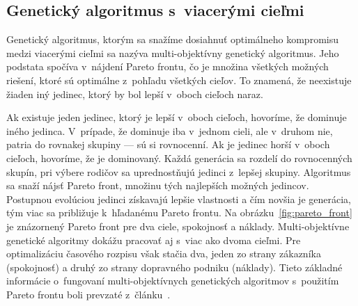 \subsection*{Genetický algoritmus s~viacerými cieľmi}
Genetický algoritmus, ktorým sa snažíme dosiahnuť optimálneho kompromisu medzi viacerými cieľmi sa nazýva multi-objektívny genetický algoritmus.
Jeho podstata spočíva v~nájdení Pareto frontu, čo je množina všetkých možných riešení, ktoré sú optimálne z~pohľadu všetkých cieľov.
To znamená, že neexistuje žiaden iný jedinec, ktorý by bol lepší v~oboch cieľoch naraz.

Ak existuje jeden jedinec, ktorý je lepší v~oboch cieľoch, hovoríme, že dominuje iného jedinca.
V~prípade, že dominuje iba v~jednom cieli, ale v~druhom nie, patria do rovnakej skupiny --- sú si rovnocenní.
Ak je jedinec horší v~oboch cieľoch, hovoríme, že je dominovaný.
Každá generácia sa rozdelí do rovnocenných skupín, pri výbere rodičov sa uprednostňujú jedinci z~lepšej skupiny.
Algoritmus sa snaží nájsť Pareto front, množinu tých najlepších možných jedincov.
Postupnou evolúciou jedinci získavajú lepšie vlastnosti a čím novšia je generácia, tým viac sa približuje k~hľadanému Pareto frontu.
Na obrázku~\ref{fig:pareto_front} je znázornený Pareto front pre dva ciele, spokojnosť a náklady.
Multi-objektívne genetické algoritmy dokážu pracovať aj s~viac ako dvoma cieľmi.
Pre optimalizáciu časového rozpisu však stačia dva, jeden zo strany zákazníka (spokojnosť) a druhý zo strany dopravného podniku (náklady).
Tieto základné informácie o~fungovaní multi-objektívnych genetických algoritmov s~použitím Pareto frontu boli prevzaté z~článku~\cite{ngatchou2005pareto}.


